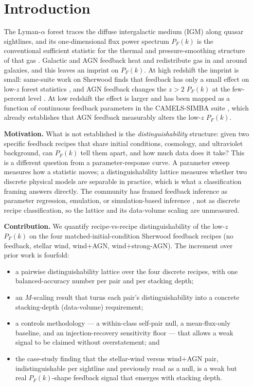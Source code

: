 \section{Introduction}
\label{sec:intro}

The Lyman-$\alpha$ forest traces the diffuse intergalactic medium (IGM) along
quasar sightlines, and its one-dimensional flux power spectrum $P_F(k)$ is the
conventional sufficient statistic for the thermal and pressure-smoothing
structure of that gas \citep{McDonald2000,Walther2018,Walther2019}. Galactic and
AGN feedback heat and redistribute gas in and around galaxies, and this leaves an
imprint on $P_F(k)$. At high redshift the imprint is small: same-suite work on
Sherwood finds that feedback has only a small effect on low-$z$ forest statistics
\citep{Nasir2017}, and AGN feedback changes the $z>2$ $P_F(k)$ at the few-percent
level \citep{TillmanApJ2024}. At low redshift the effect is larger and has been
mapped as a function of continuous feedback parameters in the CAMELS-SIMBA suite
\citep{Pirecki2025}, which already establishes that AGN feedback measurably
alters the low-$z$ $P_F(k)$.

\textbf{Motivation.} What is not established is the \emph{distinguishability}
structure: given two specific feedback recipes that share initial conditions,
cosmology, and ultraviolet background, can $P_F(k)$ tell them apart, and how much
data does it take? This is a different question from a parameter-response curve.
A parameter sweep measures how a statistic moves; a distinguishability lattice
measures whether two discrete physical models are separable in practice, which is
what a classification framing answers directly. The community has framed feedback
inference as parameter regression, emulation, or simulation-based inference
\citep{Pirecki2025,TillmanApJ2024,Sinigaglia2026}, not as discrete recipe
classification, so the lattice and its data-volume scaling are unmeasured.

\textbf{Contribution.} We quantify recipe-vs-recipe distinguishability of the
low-$z$ $P_F(k)$ on the four matched-initial-condition Sherwood feedback recipes
(no feedback, stellar wind, wind${+}$AGN, wind${+}$strong-AGN). The increment
over prior work is fourfold:
\begin{itemize}
  \item a pairwise distinguishability lattice over the four discrete recipes,
        with one balanced-accuracy number per pair and per stacking depth;
  \item an $M$-scaling result that turns each pair's distinguishability into a
        concrete stacking-depth (data-volume) requirement;
  \item a controls methodology --- a within-class self-pair null, a
        mean-flux-only baseline, and an injection-recovery sensitivity floor ---
        that allows a weak signal to be claimed without overstatement; and
  \item the case-study finding that the stellar-wind versus wind${+}$AGN pair,
        indistinguishable per sightline and previously read as a null, is a weak
        but real $P_F(k)$-shape feedback signal that emerges with stacking depth.
\end{itemize}

